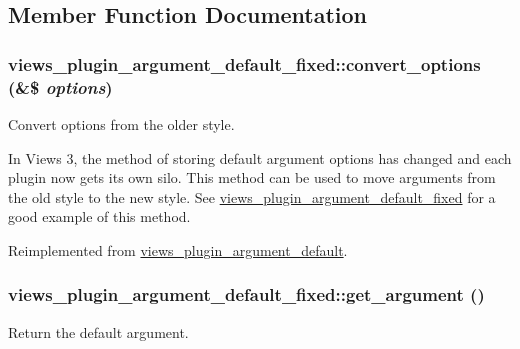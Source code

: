 \subsection{Member Function Documentation}
\hypertarget{classviews__plugin__argument__default__fixed_a69ba4df78a331a961cc021e3b1f662b7}{
\subsubsection[{convert\_\-options}]{\setlength{\rightskip}{0pt plus 5cm}views\_\-plugin\_\-argument\_\-default\_\-fixed::convert\_\-options (\&\$ {\em options})}}
\label{classviews__plugin__argument__default__fixed_a69ba4df78a331a961cc021e3b1f662b7}
Convert options from the older style.

In Views 3, the method of storing default argument options has changed and each plugin now gets its own silo. This method can be used to move arguments from the old style to the new style. See \hyperlink{classviews__plugin__argument__default__fixed}{views\_\-plugin\_\-argument\_\-default\_\-fixed} for a good example of this method. 

Reimplemented from \hyperlink{classviews__plugin__argument__default_a4f4afb816d9f6451a7d070fa7b75c8c2}{views\_\-plugin\_\-argument\_\-default}.\hypertarget{classviews__plugin__argument__default__fixed_a4790728e6d3cae3a3a6fa5f63357a1fb}{
\subsubsection[{get\_\-argument}]{\setlength{\rightskip}{0pt plus 5cm}views\_\-plugin\_\-argument\_\-default\_\-fixed::get\_\-argument ()}}
\label{classviews__plugin__argument__default__fixed_a4790728e6d3cae3a3a6fa5f63357a1fb}
Return the default argument. 


